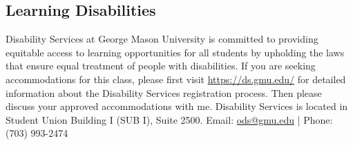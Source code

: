 \documentclass[11pt]{article}
\begin{document}
\subsection{Learning Disabilities}

Disability Services at George Mason University is committed to providing equitable access to learning opportunities for all students by upholding the laws that ensure equal treatment of people with disabilities. If you are seeking accommodations for this class, please first visit \url{https://ds.gmu.edu/} for detailed information about the Disability Services registration process. Then please discuss your approved accommodations with me. Disability Services is located in Student Union Building I (SUB I), Suite 2500. Email: \href{mailto:ods@gmu.edu}{ods@gmu.edu} | Phone: (703) 993-2474
\end{document}
